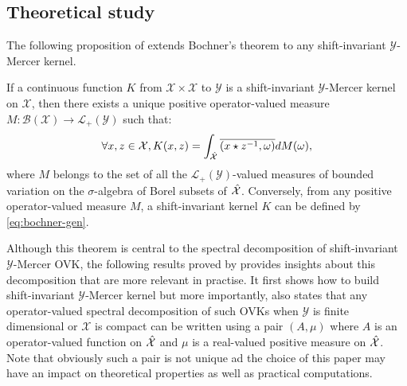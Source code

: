 \subsection{Theoretical study}
The following proposition of \citet{Zhang2012,Carmeli2010} extends Bochner's theorem to any shift-invariant $\mathcal{Y}$-Mercer kernel. 
\begin{proposition}
If a continuous function $K$ from $\mathcal{X} \times \mathcal{X}$ to $\mathcal{Y}$ is a shift-invariant $\mathcal{Y}$-Mercer kernel on $\mathcal{X}$, then there exists a unique positive operator-valued measure $M: \mathcal{B}(\mathcal{X}) \to \mathcal{L}_+(\mathcal{Y})$ such that:
\begin{equation}\label{eq:bochner-gen}
\forall x, z \in \mathcal{X}, K(x, z) = \int_{\hat{\mathcal{X}}} \overline{(x \star {z}^{-1}, \omega)} dM(\omega),
\end{equation}
where $M$ belongs to the set of all the $\mathcal{L}_+(\mathcal{Y})$-valued measures of bounded variation on the $\sigma$-algebra of Borel subsets of $\hat{\mathcal{X}}$. Conversely, from any positive operator-valued measure $M$, a shift-invariant kernel $K$ can be defined by \cref{eq:bochner-gen}. 
\end{proposition}
Although this theorem is central to the spectral decomposition of shift-invariant $\mathcal{Y}$-Mercer \acs{OVK}, the following results proved by \citet{Carmeli2010} provides insights about this decomposition that are more relevant in practise. It first shows how to build shift-invariant $\mathcal{Y}$-Mercer kernel but more importantly, also states that any operator-valued spectral decomposition of such \acs{OVK}s when $\mathcal{Y}$ is finite dimensional or $\mathcal{X}$ is compact can be written using a pair $(A, \mu)$ where $A$ is an operator-valued function on $\hat{\mathcal{X}}$ and $\mu$ is a real-valued positive measure on $\hat{\mathcal{X}}$. Note that obviously such a pair is not unique ad the choice of this paper may have an impact on theoretical properties as well as practical computations.
